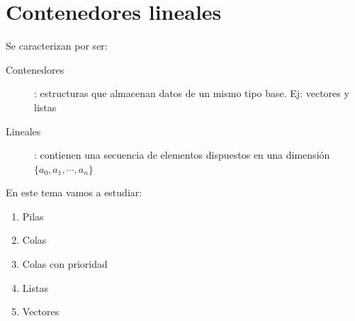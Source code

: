 \documentclass[10pt,a4paper,spanish]{report}
\begin{document}
\section{\textcolor[rgb]{0.2,0.5,0.5}Contenedores lineales}
\noindent
Se caracterizan por ser:
\begin{description}
    \item[Contenedores]: estructuras que almacenan datos de un mismo tipo base. Ej: vectores y listas
    \item[Lineales]: contienen una secuencia de elementos dispuestos en una dimensión $\{a_{0}, a_{1}, \cdots, a_{n}\}$
\end{description}

\noindent
En este tema vamos a estudiar:
\begin{enumerate}[---]
    \item Pilas
    \item Colas
    \item Colas con prioridad
    \item Listas
    \item Vectores
\end{enumerate}
\end{document}
